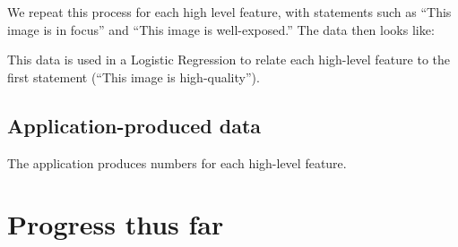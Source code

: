 \documentclass[10pt,twocolumn]{article}
\begin{document}
We repeat this process for each high level feature, with statements such as ``This image is in focus'' and ``This image is well-exposed.'' The data then looks like:


This data is used in a Logistic Regression to relate each high-level feature to the first statement (``This image is high-quality'').

\subsection{Application-produced data}
The application produces numbers for each high-level feature.

\section{Progress thus far}
\end{document}
